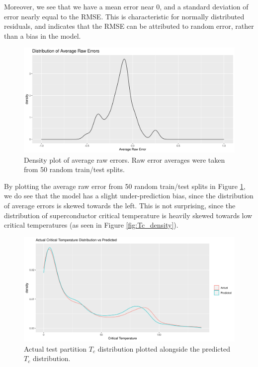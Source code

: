 \documentclass[oneside,12pt]{amsart}
\begin{document}
Moreover, we see that we have a mean error near 0, and a standard deviation of error nearly equal to the RMSE. This is characteristic for normally distributed residuals, and indicates that the RMSE can be attributed to random error, rather than a bias in the model.

 \begin{figure}[ht]
     \centering
     \includegraphics[width=0.8\linewidth]{../Plots/control_ave_err_density.png}
     \caption{Density plot of average raw errors. Raw error averages were taken from 50 random train/test splits.}
     \label{fig:err_denisty}
 \end{figure}

By plotting the average raw error from 50 random train/test splits in Figure \ref{fig:err_denisty}, we do see that the model has a slight under-prediction bias, since the distribution of average errors is skewed towards the left. This is not surprising, since the distribution of superconductor critical temperature is heavily skewed towards low critical temperatures (as seen in Figure \ref{fig:Tc_density}).


\begin{figure}[ht]
    \centering
    \includegraphics[width=0.8\linewidth]{../Plots/Actual_vs_Pred_dist.png}
    \caption{Actual test partition $T_c$ distribution plotted alongside the predicted $T_c$ distribution. }
    \label{fig:actual_vs_pred_Tc_dist}
\end{figure}
 
\end{document}
